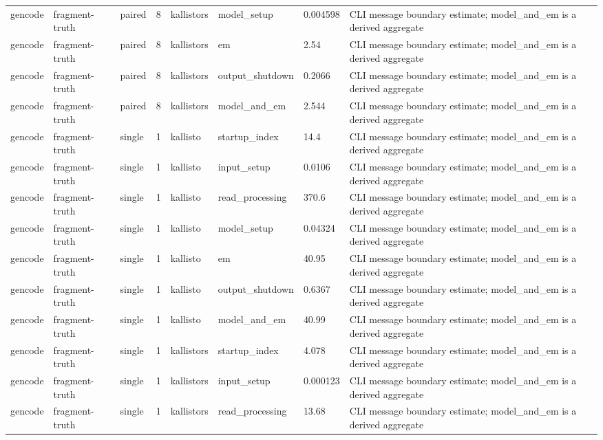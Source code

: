 \begin{tabular}{llllllll}
gencode & fragment-truth & paired & 8 & kallistors & model\_setup & 0.004598 & CLI message boundary estimate; model\_and\_em is a derived aggregate \\
gencode & fragment-truth & paired & 8 & kallistors & em & 2.54 & CLI message boundary estimate; model\_and\_em is a derived aggregate \\
gencode & fragment-truth & paired & 8 & kallistors & output\_shutdown & 0.2066 & CLI message boundary estimate; model\_and\_em is a derived aggregate \\
gencode & fragment-truth & paired & 8 & kallistors & model\_and\_em & 2.544 & CLI message boundary estimate; model\_and\_em is a derived aggregate \\
gencode & fragment-truth & single & 1 & kallisto & startup\_index & 14.4 & CLI message boundary estimate; model\_and\_em is a derived aggregate \\
gencode & fragment-truth & single & 1 & kallisto & input\_setup & 0.0106 & CLI message boundary estimate; model\_and\_em is a derived aggregate \\
gencode & fragment-truth & single & 1 & kallisto & read\_processing & 370.6 & CLI message boundary estimate; model\_and\_em is a derived aggregate \\
gencode & fragment-truth & single & 1 & kallisto & model\_setup & 0.04324 & CLI message boundary estimate; model\_and\_em is a derived aggregate \\
gencode & fragment-truth & single & 1 & kallisto & em & 40.95 & CLI message boundary estimate; model\_and\_em is a derived aggregate \\
gencode & fragment-truth & single & 1 & kallisto & output\_shutdown & 0.6367 & CLI message boundary estimate; model\_and\_em is a derived aggregate \\
gencode & fragment-truth & single & 1 & kallisto & model\_and\_em & 40.99 & CLI message boundary estimate; model\_and\_em is a derived aggregate \\
gencode & fragment-truth & single & 1 & kallistors & startup\_index & 4.078 & CLI message boundary estimate; model\_and\_em is a derived aggregate \\
gencode & fragment-truth & single & 1 & kallistors & input\_setup & 0.000123 & CLI message boundary estimate; model\_and\_em is a derived aggregate \\
gencode & fragment-truth & single & 1 & kallistors & read\_processing & 13.68 & CLI message boundary estimate; model\_and\_em is a derived aggregate \\

\end{tabular}
